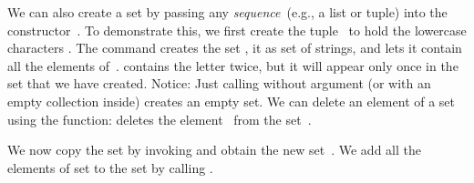 %
We can also create a set by passing any \emph{sequence}~(e.g., a list or tuple) into the constructor~.
To demonstrate this, we first create the tuple~ to hold the lowercase characters .
The command  creates the set ,  it as set of strings, and lets it contain all the elements of~.
 contains the letter  twice, but it will appear only once in the set that we have created.
Notice: Just calling  without argument (or with an empty collection inside) creates an empty set.
We can delete an element of a set using the  function:
 deletes the element~ from the set~.

We now copy the set  by invoking  and obtain the new set~.
We add all the elements of set  to the set  by calling .

